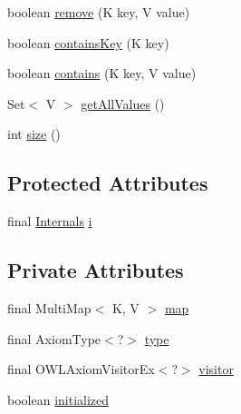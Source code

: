 \begin{DoxyCompactItemize}
boolean \hyperlink{classuk_1_1ac_1_1manchester_1_1cs_1_1owl_1_1owlapi_1_1_map_pointer_3_01_k_00_01_v_01extends_01_o_w_l_axiom_01_4_a3380fe3d4d40e4cd47e58681f23fc85e}{remove} (K key, V value)
\item 
boolean \hyperlink{classuk_1_1ac_1_1manchester_1_1cs_1_1owl_1_1owlapi_1_1_map_pointer_3_01_k_00_01_v_01extends_01_o_w_l_axiom_01_4_a692d684369b218afb116f175f792c720}{contains\-Key} (K key)
\item 
boolean \hyperlink{classuk_1_1ac_1_1manchester_1_1cs_1_1owl_1_1owlapi_1_1_map_pointer_3_01_k_00_01_v_01extends_01_o_w_l_axiom_01_4_abb5f888d97829acf7b2b4ac9eb46d53d}{contains} (K key, V value)
\item 
Set$<$ V $>$ \hyperlink{classuk_1_1ac_1_1manchester_1_1cs_1_1owl_1_1owlapi_1_1_map_pointer_3_01_k_00_01_v_01extends_01_o_w_l_axiom_01_4_a121f75bc5d8c6f33050872824c6326b0}{get\-All\-Values} ()
\item 
int \hyperlink{classuk_1_1ac_1_1manchester_1_1cs_1_1owl_1_1owlapi_1_1_map_pointer_3_01_k_00_01_v_01extends_01_o_w_l_axiom_01_4_a0c7e489cfa1ece66ea37ffafebb9cceb}{size} ()
\end{DoxyCompactItemize}
\subsection*{Protected Attributes}
\begin{DoxyCompactItemize}
\item 
final \hyperlink{interfaceuk_1_1ac_1_1manchester_1_1cs_1_1owl_1_1owlapi_1_1_internals}{Internals} \hyperlink{classuk_1_1ac_1_1manchester_1_1cs_1_1owl_1_1owlapi_1_1_map_pointer_3_01_k_00_01_v_01extends_01_o_w_l_axiom_01_4_af74c2b3367a3d3b09269fbc9025fdaa8}{i}
\end{DoxyCompactItemize}
\subsection*{Private Attributes}
\begin{DoxyCompactItemize}
\item 
final Multi\-Map$<$ K, V $>$ \hyperlink{classuk_1_1ac_1_1manchester_1_1cs_1_1owl_1_1owlapi_1_1_map_pointer_3_01_k_00_01_v_01extends_01_o_w_l_axiom_01_4_a999b90fb2d697d5830fa77e2ce4eb679}{map}
\item 
final Axiom\-Type$<$?$>$ \hyperlink{classuk_1_1ac_1_1manchester_1_1cs_1_1owl_1_1owlapi_1_1_map_pointer_3_01_k_00_01_v_01extends_01_o_w_l_axiom_01_4_a86ceeb1353e363f730a7f06e4b027149}{type}
\item 
final O\-W\-L\-Axiom\-Visitor\-Ex$<$?$>$ \hyperlink{classuk_1_1ac_1_1manchester_1_1cs_1_1owl_1_1owlapi_1_1_map_pointer_3_01_k_00_01_v_01extends_01_o_w_l_axiom_01_4_a3485bef61400178b729e43795a518e97}{visitor}
\item 
boolean \hyperlink{classuk_1_1ac_1_1manchester_1_1cs_1_1owl_1_1owlapi_1_1_map_pointer_3_01_k_00_01_v_01extends_01_o_w_l_axiom_01_4_a7ef53aea25e38c2c000b21ad300be956}{initialized}
\end{DoxyCompactItemize}

